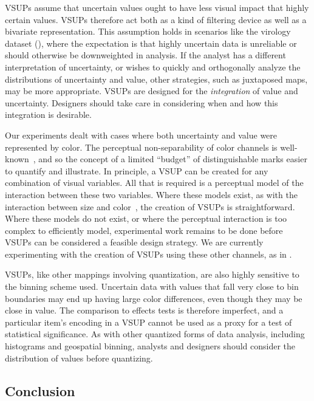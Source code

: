 VSUPs assume that uncertain values ought to have less visual impact that highly certain values. VSUPs therefore act both as a kind of filtering device as well as a bivariate representation. This assumption holds in scenarios like the virology dataset (), where the expectation is that highly uncertain data is unreliable or should otherwise be downweighted in analysis. If the analyst has a different interpretation of uncertainty, or wishes to quickly and orthogonally analyze the distributions of uncertainty and value, other strategies, such as juxtaposed maps, may be more appropriate. VSUPs are designed for the \emph{integration} of value and uncertainty. Designers should take care in considering when and how this integration is desirable.

Our experiments dealt with cases where both uncertainty and value were represented by color. The perceptual non-separability of color channels is well-known~\cite{garner1970integrality, ware2012information}, and so the concept of a limited ``budget'' of distinguishable marks easier to quantify and illustrate. In principle, a VSUP can be created for any combination of visual variables. All that is required is a perceptual model of the interaction between these two variables. Where these models exist, as with the interaction between size and color~\cite{stone2014engineering}, the creation of VSUPs is straightforward. Where these models do not exist, or where the perceptual interaction is too complex to efficiently model, experimental work remains to be done before VSUPs can be considered a feasible design strategy. We are currently experimenting with the creation of VSUPs using these other channels, as in .

VSUPs, like other mappings involving quantization, are also highly sensitive to the binning scheme used. Uncertain data with values that fall very close to bin boundaries may end up having large color differences, even though they may be close in value. The comparison to effects tests is therefore imperfect, and a particular item's encoding in a VSUP cannot be used as a proxy for a test of statistical significance. As with other quantized forms of data analysis, including histograms and geospatial binning, analysts and designers should consider the distribution of values before quantizing.

\subsection{Conclusion}

